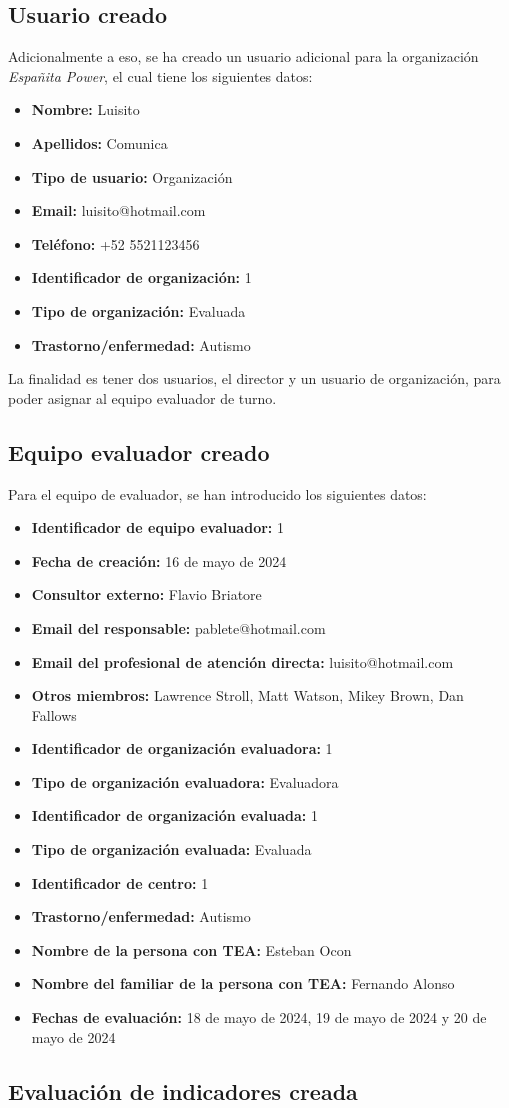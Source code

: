 \subsection{Usuario creado}
Adicionalmente a eso, se ha creado un usuario adicional para la organización \textit{Españita Power}, el cual tiene los siguientes datos:
\begin{itemize}
    \item \textbf{Nombre: }Luisito
    \item \textbf{Apellidos: }Comunica
    \item \textbf{Tipo de usuario: }Organización
    \item \textbf{Email: }luisito@hotmail.com
    \item \textbf{Teléfono: }+52 5521123456
    \item \textbf{Identificador de organización: }1
    \item \textbf{Tipo de organización: }Evaluada
    \item \textbf{Trastorno/enfermedad: }Autismo
\end{itemize}
La finalidad es tener dos usuarios, el director y un usuario de organización,
para poder asignar al equipo evaluador de turno.
\subsection{Equipo evaluador creado}
Para el equipo de evaluador, se han introducido los siguientes datos:
\begin{itemize}
    \item \textbf{Identificador de equipo evaluador: }1
    \item \textbf{Fecha de creación: }16 de mayo de 2024
    \item \textbf{Consultor externo: }Flavio Briatore
    \item \textbf{Email del responsable: }pablete@hotmail.com
    \item \textbf{Email del profesional de atención directa: }luisito@hotmail.com
    \item \textbf{Otros miembros: }Lawrence Stroll, Matt Watson, Mikey Brown, Dan Fallows
    \item \textbf{Identificador de organización evaluadora: }1
    \item \textbf{Tipo de organización evaluadora: }Evaluadora
    \item \textbf{Identificador de organización evaluada: }1
    \item \textbf{Tipo de organización evaluada: }Evaluada
    \item \textbf{Identificador de centro: }1
    \item \textbf{Trastorno/enfermedad: }Autismo
    \item \textbf{Nombre de la persona con TEA: }Esteban Ocon
    \item \textbf{Nombre del familiar de la persona con TEA: }Fernando Alonso
    \item \textbf{Fechas de evaluación: }18 de mayo de 2024, 19 de mayo de 2024 y 20 de mayo de 2024
\end{itemize}
\subsection{Evaluación de indicadores creada}
